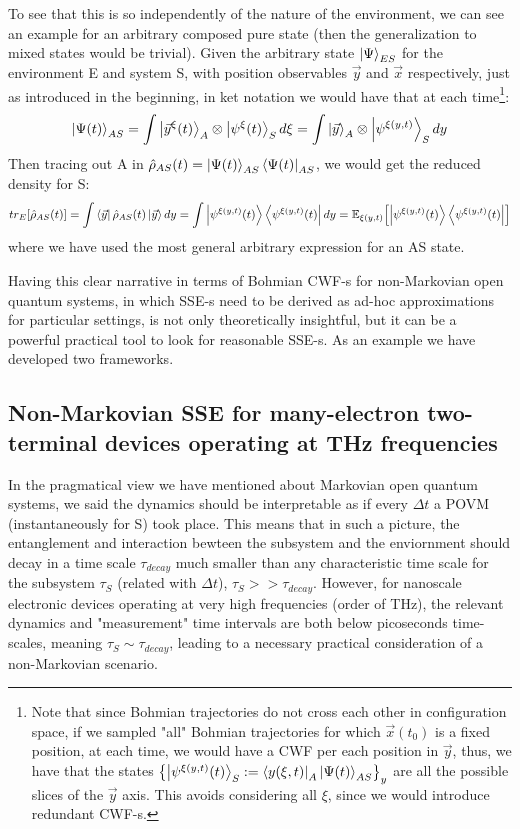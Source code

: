\documentclass[11pt, a4paper]{article} %
\begin{document}
To see that this is so independently of the nature of the environment, we can see an example for an arbitrary composed pure state (then the generalization to mixed states would be trivial). Given the arbitrary state $\ket{\Psi}_{ES}$ for the environment E and system S, with position observables $\vec{y}$ and $\vec{x}$ respectively, just as introduced in the beginning, in ket notation we would have that at each time\footnote{Note that since Bohmian trajectories do not cross each other in configuration space, if we sampled "all" Bohmian trajectories for which $\vec{x}(t_0)$ is a fixed position, at each time, we would have a CWF per each position in $\vec{y}$, thus, we have that the states $\qty{\ket{\psi^{\xi(y,t)}(t)}_S:=\bra{y(\xi,t)}_A\ket{\Psi(t)}_{AS}}_y$ are all the possible slices of the $\vec{y}$ axis. This avoids considering all $\xi$, since we would introduce redundant CWF-s.}:
\begin{equation}
\ket{\Psi(t)}_{AS}=\int\ket{\vec{y}^\xi(t)}_A\otimes \ket{\psi^\xi(t)}_S d\xi = \int\ket{\vec{y}}_A\otimes \ket{\psi^{\xi(y,t)}}_S dy
\end{equation}
Then tracing out A in $\hat{\rho}_{AS}(t)=\ket{\Psi(t)}_{AS}\bra{\Psi(t)}_{AS}$, we would get the reduced density for S:
\begin{equation}
tr_E\qty[\hat{\rho}_{AS}(t)] = \int\bra{\vec{y}}\hat{\rho}_{AS}(t)\ket{\vec{y}}dy = \int \ket{\psi^{\xi(y,t)}(t)}\bra{\psi^{\xi(y,t)}(t)} dy = \mathbb{E}_{\xi(y,t)}\qty[\ket{\psi^{\xi(y,t)}(t)}\bra{\psi^{\xi(y,t)}(t)}]
\end{equation}
where we have used the most general arbitrary expression for an AS state.

Having this clear narrative in terms of Bohmian CWF-s for non-Markovian open quantum systems, in which SSE-s need to be derived as ad-hoc approximations for particular settings, is not only theoretically insightful, but it can be a powerful practical tool to look for reasonable SSE-s. As an example we have developed two frameworks.

\subsection*{Non-Markovian SSE for many-electron two-terminal devices operating at THz frequencies}
In the pragmatical view we have mentioned about Markovian open quantum systems, we said the dynamics should be interpretable as if every $\Delta t$ a POVM (instantaneously for S) took place. This means that in such a picture, the entanglement and interaction bewteen the subsystem and the enviornment should decay in a time scale $\tau_{decay}$ much smaller than any characteristic time scale for the subsystem $\tau_S$ (related with $\Delta t$), $\tau_S>>\tau_{decay}$. However, for nanoscale electronic devices operating at very high frequencies (order of THz), the relevant dynamics and "measurement" time intervals are both below picoseconds time-scales, meaning $\tau_S\sim \tau_{decay}$, leading to a necessary practical consideration of a non-Markovian scenario.
\end{document}

